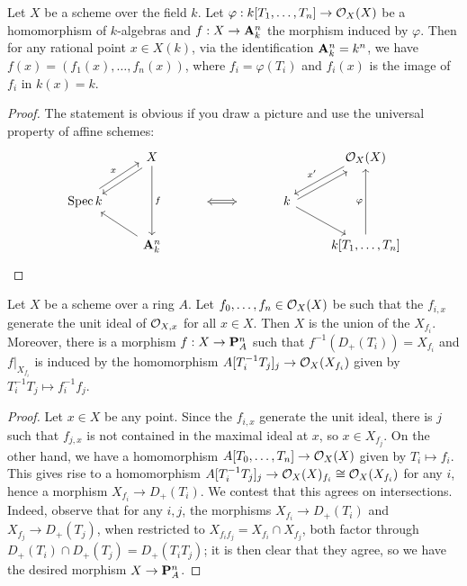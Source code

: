 \begin{exer}
	Let $X$ be a scheme over the field $k$. Let $\varphi: k[T_1,\ldots,T_n]
	\to \mathcal{O}_X(X)$ be a homomorphism of $k$-algebras and $f: X \to \mathbf{A}_k^n$
	the morphism induced by $\varphi$. Then for any rational point $x \in
	X(k)$, via the identification $\mathbf{A}_k^n = k^n$, we have $f(x) =
	(f_1(x),\ldots,f_n(x))$, where $f_i = \varphi(T_i)$ and $f_i(x)$ is the
	image of $f_i$ in $k(x) = k$.
\end{exer}
\begin{proof}
	The statement is obvious if you draw a picture and use the universal
	property of affine schemes:
	\[\begin{tikzcd}
						  &  X \arrow[dl,shift left]
						       \arrow[dd,"f"]
						  & & &
					       & \Sh_X(X) \ar[dl,shift right,
						  "x'"']
						  \\
		\Spec k \ar[ur,shift left,"x"] &{}&
						\ar[r, Leftrightarrow]
					       &{}&
						 k \ar[ur,shift right] \ar[dr]&
						 \\
						 & \Aff_k^n \arrow[ul]
						 & & &
					       & k[T_1,\ldots,T_n]
						  	\ar[uu,"\varphi"]
	\end{tikzcd}\]
\end{proof}

\begin{exer}
	Let $X$ be a scheme over a ring $A$. Let $f_0,\ldots,f_n \in \mathcal{O}_X(X)$
	be such that the $f_{i,x}$ generate the unit ideal of $\mathcal{O}_{X,x}$ for
	all $x \in X$. Then $X$ is the union of the $X_{f_i}$. Moreover,
	there is a morphism $f: X \to \mathbf{P}^n_A$ such that $f^{-1}(D_+(T_i)) =
	X_{f_i}$ and ${f|}_{X_{f_i}}$ is induced by the homomorphism
	$A[T_i^{-1}T_j]_j \to \mathcal{O}_X(X_{f_i})$ given by $T_i^{-1}T_j \mapsto
	f_i^{-1}f_j$.
\end{exer}
\begin{proof}
	Let $x \in X$ be any point. Since the $f_{i,x}$ generate the unit ideal,
	there is $j$ such that $f_{j,x}$ is not contained in the maximal ideal
	at $x$, so $x \in X_{f_j}$. On the other hand, we have a homomorphism
	$A[T_0,\ldots,T_n] \to \mathcal{O}_X(X)$ given by $T_i \mapsto f_i$. This gives
	rise to a homomorphism $A[T_i^{-1}T_j]_j \to \mathcal{O}_X(X)_{f_i} \cong
	\mathcal{O}_X(X_{f_i})$ for any $i$, hence a morphism $X_{f_i} \to D_+(T_i)$. We
	contest that this agrees on intersections. Indeed, observe that for any
	$i,j$, the morphisms $X_{f_i} \to D_+(T_i)$ and $X_{f_j} \to D_+(T_j)$,
	when restricted to $X_{f_if_j} = X_{f_i} \cap X_{f_j}$,
	both factor through $D_+(T_i) \cap D_+(T_j) = D_+(T_iT_j)$; it is then
	clear that they agree, so we have the desired morphism $X \to \mathbf{P}^n_A$.
\end{proof}

